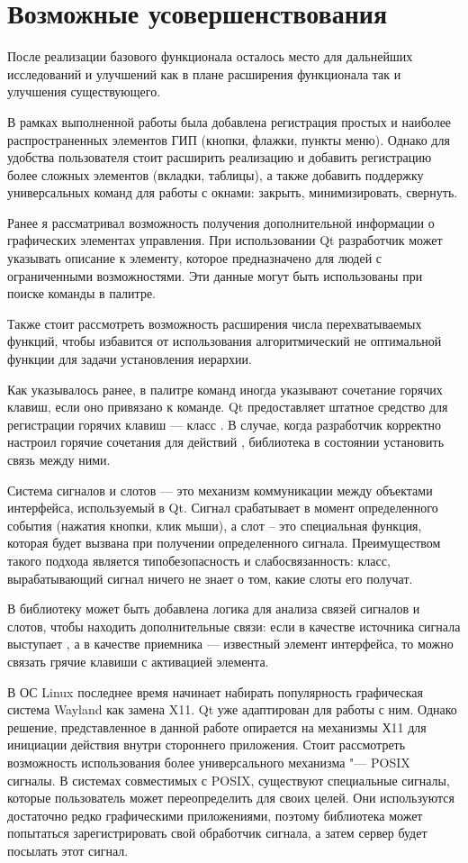\section{Возможные усовершенствования}

После реализации базового функционала осталось место для дальнейших
исследований и улучшений как в плане расширения функционала так и улучшения
существующего.

В рамках выполненной работы была добавлена регистрация простых и наиболее
распространенных элементов ГИП (кнопки, флажки, пункты меню). Однако для
удобства пользователя стоит расширить реализацию и добавить регистрацию более
сложных элементов (вкладки, таблицы), а также добавить поддержку универсальных
команд для работы с окнами: закрыть, минимизировать, свернуть.

Ранее я рассматривал \cite{polshakovvoice} возможность получения дополнительной
информации о графических элементах управления. При использовании Qt разработчик
может указывать описание к элементу, которое предназначено для людей с
ограниченными возможностями. Эти данные могут быть использованы при поиске
команды в палитре.

Также стоит рассмотреть возможность расширения числа перехватываемых функций,
чтобы избавится от использования алгоритмический не оптимальной функции для
задачи установления иерархии.

Как указывалось ранее, в палитре команд иногда указывают сочетание горячих
клавиш, если оно привязано к команде. Qt предоставляет штатное средство для
регистрации горячих клавиш — класс . В случае, когда разработчик
корректно настроил горячие сочетания для действий , библиотека в
состоянии установить связь между ними.

Система сигналов и слотов — это механизм коммуникации между объектами
интерфейса, используемый в Qt. Сигнал срабатывает в момент определенного
события (нажатия кнопки, клик мыши), а слот – это специальная функция, которая
будет вызвана при получении определенного сигнала. Преимуществом такого подхода
является типобезопасность и слабосвязанность: класс, вырабатывающий сигнал
ничего не знает о том, какие слоты его получат.

В библиотеку может быть добавлена логика для анализа связей сигналов и слотов,
чтобы находить дополнительные связи: если в качестве источника сигнала выступает
, а в качестве приемника — известный элемент интерфейса, то
можно связать грячие клавиши с активацией элемента.

В ОС Linux последнее время начинает набирать популярность графическая система
Wayland как замена X11\cite{wayland}. Qt уже адаптирован для работы с ним.
Однако решение, представленное в данной работе опирается на механизмы Х11 для
инициации действия внутри стороннего приложения. Стоит рассмотреть возможность
использования более универсального механизма "--- POSIX сигналы. В системах
совместимых с POSIX, существуют специальные сигналы, которые пользователь может
переопределить для своих целей. Они используются достаточно редко графическими
приложениями, поэтому библиотека может попытаться зарегистрировать свой
обработчик сигнала, а затем сервер будет посылать этот сигнал.

